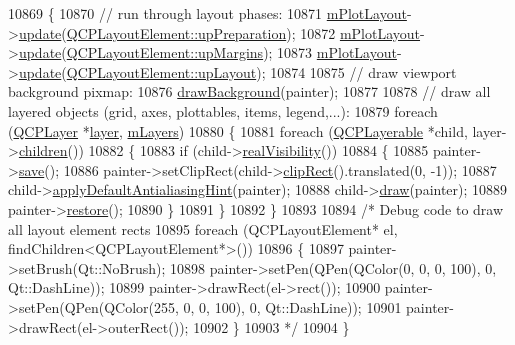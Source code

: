 \begin{DoxyCode}
10869 \{
10870   \textcolor{comment}{// run through layout phases:}
10871   \hyperlink{class_q_custom_plot_ac97298756882a0eecd98151679850ac1}{mPlotLayout}->\hyperlink{class_q_c_p_layout_a34ab477e820537ded7bade4399c482fd}{update}(\hyperlink{class_q_c_p_layout_element_a0d83360e05735735aaf6d7983c56374dad6119882eba136357c2f627992e527d3}{QCPLayoutElement::upPreparation});
10872   \hyperlink{class_q_custom_plot_ac97298756882a0eecd98151679850ac1}{mPlotLayout}->\hyperlink{class_q_c_p_layout_a34ab477e820537ded7bade4399c482fd}{update}(\hyperlink{class_q_c_p_layout_element_a0d83360e05735735aaf6d7983c56374da288cb59a92280e47261a341f2813e676}{QCPLayoutElement::upMargins});
10873   \hyperlink{class_q_custom_plot_ac97298756882a0eecd98151679850ac1}{mPlotLayout}->\hyperlink{class_q_c_p_layout_a34ab477e820537ded7bade4399c482fd}{update}(\hyperlink{class_q_c_p_layout_element_a0d83360e05735735aaf6d7983c56374da5d1ccf5d79967c232c3c511796860045}{QCPLayoutElement::upLayout});
10874   
10875   \textcolor{comment}{// draw viewport background pixmap:}
10876   \hyperlink{class_q_custom_plot_a05dd52438cee4353b18c1e53a439008d}{drawBackground}(painter);
10877 
10878   \textcolor{comment}{// draw all layered objects (grid, axes, plottables, items, legend,...):}
10879   \textcolor{keywordflow}{foreach} (\hyperlink{class_q_c_p_layer}{QCPLayer} *\hyperlink{class_q_custom_plot_aac492da01782820454e9136a8db28182}{layer}, \hyperlink{class_q_custom_plot_a72ee313041b873d76c198793ce7e6c37}{mLayers})
10880   \{
10881     \textcolor{keywordflow}{foreach} (\hyperlink{class_q_c_p_layerable}{QCPLayerable} *child, layer->\hyperlink{class_q_c_p_layer_a94c2f0100e48cefad2de8fe0fbb03c27}{children}())
10882     \{
10883       \textcolor{keywordflow}{if} (child->\hyperlink{class_q_c_p_layerable_a30809f7455e9794bca7b6c737622fa63}{realVisibility}())
10884       \{
10885         painter->\hyperlink{class_q_c_p_painter_a8fd6821ee6fecbfa04444c9062912abd}{save}();
10886         painter->setClipRect(child->\hyperlink{class_q_c_p_layerable_a07a8f746640c3704b09910df297afcba}{clipRect}().translated(0, -1));
10887         child->\hyperlink{class_q_c_p_layerable_afdf83ddc6a265cbf4c89fe99d3d93473}{applyDefaultAntialiasingHint}(painter);
10888         child->\hyperlink{class_q_c_p_layerable_aecf2f7087482d4b6a78cb2770e5ed12d}{draw}(painter);
10889         painter->\hyperlink{class_q_c_p_painter_a64908e6298d5bbd83457dc987cc3a022}{restore}();
10890       \}
10891     \}
10892   \}
10893   
10894   \textcolor{comment}{/* Debug code to draw all layout element rects}
10895 \textcolor{comment}{  foreach (QCPLayoutElement* el, findChildren<QCPLayoutElement*>())}
10896 \textcolor{comment}{  \{}
10897 \textcolor{comment}{    painter->setBrush(Qt::NoBrush);}
10898 \textcolor{comment}{    painter->setPen(QPen(QColor(0, 0, 0, 100), 0, Qt::DashLine));}
10899 \textcolor{comment}{    painter->drawRect(el->rect());}
10900 \textcolor{comment}{    painter->setPen(QPen(QColor(255, 0, 0, 100), 0, Qt::DashLine));}
10901 \textcolor{comment}{    painter->drawRect(el->outerRect());}
10902 \textcolor{comment}{  \}}
10903 \textcolor{comment}{  */}
10904 \}
\end{DoxyCode}


